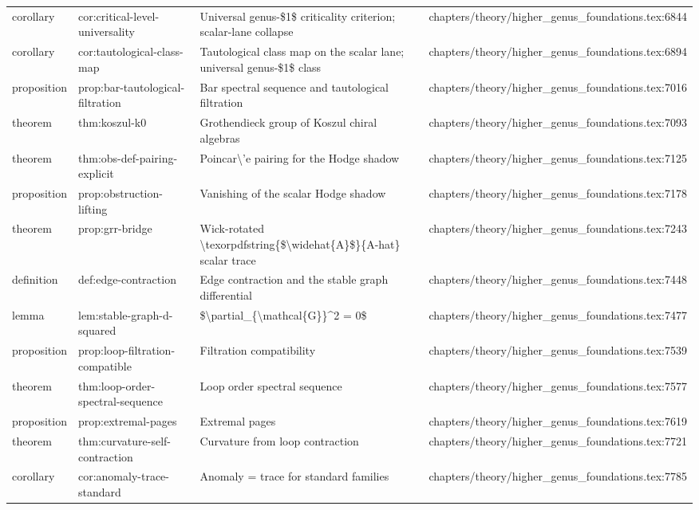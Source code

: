 \documentclass[11pt]{article}
\begin{document}
\begin{longtable}{L{0.10\textwidth}L{0.26\textwidth}L{0.42\textwidth}L{0.22\textwidth}}
corollary & cor:critical-level-universality & Universal genus-\$1\$ criticality criterion; scalar-lane collapse & chapters/theory/higher\_genus\_foundations.tex:6844\\
corollary & cor:tautological-class-map & Tautological class map on the scalar lane; universal genus-\$1\$ class & chapters/theory/higher\_genus\_foundations.tex:6894\\
proposition & prop:bar-tautological-filtration & Bar spectral sequence and tautological filtration & chapters/theory/higher\_genus\_foundations.tex:7016\\
theorem & thm:koszul-k0 & Grothendieck group of Koszul chiral algebras & chapters/theory/higher\_genus\_foundations.tex:7093\\
theorem & thm:obs-def-pairing-explicit & Poincar\textbackslash{}'e pairing for the Hodge shadow & chapters/theory/higher\_genus\_foundations.tex:7125\\
proposition & prop:obstruction-lifting & Vanishing of the scalar Hodge shadow & chapters/theory/higher\_genus\_foundations.tex:7178\\
theorem & prop:grr-bridge & Wick-rotated \textbackslash{}texorpdfstring\{\$\textbackslash{}widehat\{A\}\$\}\{A-hat\} scalar trace & chapters/theory/higher\_genus\_foundations.tex:7243\\
definition & def:edge-contraction & Edge contraction and the stable graph differential & chapters/theory/higher\_genus\_foundations.tex:7448\\
lemma & lem:stable-graph-d-squared & \$\textbackslash{}partial\_\{\textbackslash{}mathcal\{G\}\}\textasciicircum{}2 = 0\$ & chapters/theory/higher\_genus\_foundations.tex:7477\\
proposition & prop:loop-filtration-compatible & Filtration compatibility & chapters/theory/higher\_genus\_foundations.tex:7539\\
theorem & thm:loop-order-spectral-sequence & Loop order spectral sequence & chapters/theory/higher\_genus\_foundations.tex:7577\\
proposition & prop:extremal-pages & Extremal pages & chapters/theory/higher\_genus\_foundations.tex:7619\\
theorem & thm:curvature-self-contraction & Curvature from loop contraction & chapters/theory/higher\_genus\_foundations.tex:7721\\
corollary & cor:anomaly-trace-standard & Anomaly = trace for standard families & chapters/theory/higher\_genus\_foundations.tex:7785\\

\end{longtable}
\end{document}
